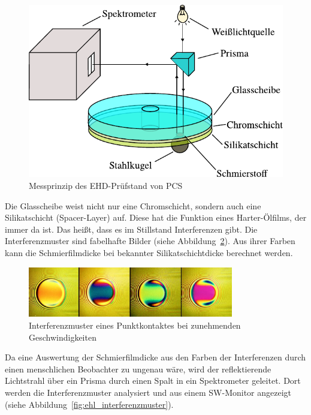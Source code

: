 \begin{figure}[htb]
    \centering
    \includegraphics[]{./images/ehd_messprinzip.pdf}
    \caption{Messprinzip des EHD-Prüfstand von PCS~\cite{mach_2008}}
    \label{fig:ehl_messprinzip}
\end{figure}

Die Glasscheibe weist nicht nur eine Chromschicht, sondern auch eine Silikatschicht (Spacer-Layer) auf.
Diese hat die Funktion eines Harter-Ölfilms, der immer da ist.
Das heißt, dass es im Stillstand Interferenzen gibt.
Die Interferenzmuster sind fabelhafte Bilder (siehe Abbildung~\ref{fig:ehl_bilder}).
Aus ihrer Farben kann die Schmierfilmdicke bei bekannter Silikatschichtdicke berechnet werden.

\begin{figure}[htb]
    \centering
    \includegraphics[width=0.8\textwidth]{./images/ehl_contact_at_increasing_speeds.png}
    \caption{Interferenzmuster eines Punktkontaktes bei zunehmenden Geschwindigkeiten~\cite{ehl_broshure}}
    \label{fig:ehl_bilder}
\end{figure}

Da eine Auswertung der Schmierfilmdicke aus den Farben der Interferenzen durch einen menschlichen Beobachter zu ungenau wäre, wird der reflektierende Lichtstrahl über ein Prisma durch einen Spalt in ein Spektrometer geleitet.
Dort werden die Interferenzmuster analysiert und aus einem SW-Monitor angezeigt (siehe Abbildung~\ref{fig:ehl_interferenzmuster}).

